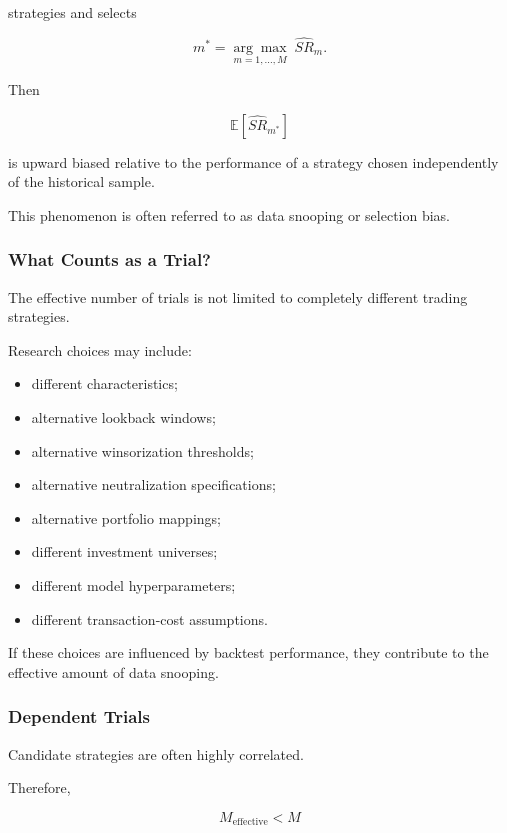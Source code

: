 \documentclass[11pt,a4paper]{article}
\begin{document}
strategies and selects

\begin{equation}
m^*
=
\underset{m=1,\ldots,M}{\arg\max}
\;
\widehat{SR}_m.
\end{equation}

Then

\begin{equation}
\boxed{
\mathbb{E}
\left[
\widehat{SR}_{m^*}
\right]
}
\end{equation}

is upward biased relative to the performance of a strategy chosen independently
of the historical sample.

This phenomenon is often referred to as data snooping or selection bias.


\subsubsection{What Counts as a Trial?}

The effective number of trials is not limited to completely different trading
strategies.

Research choices may include:

\begin{itemize}
    \item different characteristics;
    \item alternative lookback windows;
    \item alternative winsorization thresholds;
    \item alternative neutralization specifications;
    \item alternative portfolio mappings;
    \item different investment universes;
    \item different model hyperparameters;
    \item different transaction-cost assumptions.
\end{itemize}

If these choices are influenced by backtest performance, they contribute to the
effective amount of data snooping.


\subsubsection{Dependent Trials}

Candidate strategies are often highly correlated.

Therefore,

\begin{equation}
M_{\mathrm{effective}}
<
M
\end{equation}
\end{document}
